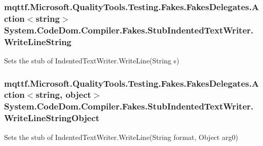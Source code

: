 \hypertarget{class_system_1_1_code_dom_1_1_compiler_1_1_fakes_1_1_stub_indented_text_writer_a6e4a5f428065000325bc9a83d31ae6e7}{
\subsubsection[{Write\-Line\-String}]{\setlength{\rightskip}{0pt plus 5cm}mqttf.\-Microsoft.\-Quality\-Tools.\-Testing.\-Fakes.\-Fakes\-Delegates.\-Action$<$string$>$ System.\-Code\-Dom.\-Compiler.\-Fakes.\-Stub\-Indented\-Text\-Writer.\-Write\-Line\-String}}\label{class_system_1_1_code_dom_1_1_compiler_1_1_fakes_1_1_stub_indented_text_writer_a6e4a5f428065000325bc9a83d31ae6e7}


Sets the stub of Indented\-Text\-Writer.\-Write\-Line(\-String s)

\hypertarget{class_system_1_1_code_dom_1_1_compiler_1_1_fakes_1_1_stub_indented_text_writer_a50e3cde3ee29fd0cca1333351b6ad8dc}{
\subsubsection[{Write\-Line\-String\-Object}]{\setlength{\rightskip}{0pt plus 5cm}mqttf.\-Microsoft.\-Quality\-Tools.\-Testing.\-Fakes.\-Fakes\-Delegates.\-Action$<$string, object$>$ System.\-Code\-Dom.\-Compiler.\-Fakes.\-Stub\-Indented\-Text\-Writer.\-Write\-Line\-String\-Object}}\label{class_system_1_1_code_dom_1_1_compiler_1_1_fakes_1_1_stub_indented_text_writer_a50e3cde3ee29fd0cca1333351b6ad8dc}


Sets the stub of Indented\-Text\-Writer.\-Write\-Line(\-String format, Object arg0)

